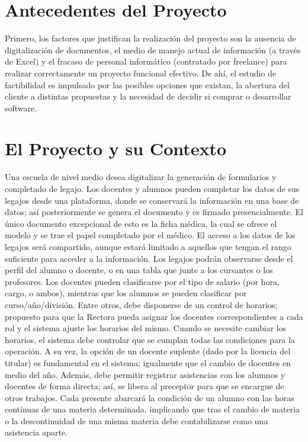 \section[Antecedentes]{Antecedentes del Proyecto}
\normalsize{ \indent
Primero, los factores que justifican la realización del
proyecto son la ausencia de digitalización de documentos,
el medio de manejo actual de información (a través de Excel)
y el fracaso de personal informático (contratado por freelance)
para realizar correctamente un proyecto funcional efectivo.
De ahí, el estudio de factibilidad es impulsado por las posibles
opciones que existan, la abertura del cliente a distintas
propuestas y la necesidad de decidir si comprar o desarrollar
software.
}
\section[Contexto]{El Proyecto y su Contexto}
\normalsize{ \indent
Una escuela de nivel medio desea digitalizar la generación
de formularios y completado de legajo. Los docentes y alumnos
pueden completar los datos de sus legajos desde una plataforma,
donde se conservará la información en una base de datos; así
posteriormente se genera el documento y es firmado
presencialmente. El único documento excepcional de esto es la
ficha médica, la cual se ofrece el modelo y se trae el papel
completado por el médico.
}
\newline
\normalsize{ \indent
El acceso a los datos de los legajos será compartido,
aunque estará limitado a aquellos que tengan el rango
suficiente para acceder a la información. Los legajos
podrán observarse desde el perfil del alumno o docente,
o en una tabla que junte a los cursantes o los profesores.
Los docentes pueden clasificarse por el tipo de salario
(por hora, cargo, o ambos), mientras que los alumnos se
pueden clasificar por curso/año/división.
}
\newline
\normalsize{ \indent
Entre otros, debe disponerse de un control de horarios;
propuesto para que la Rectora pueda asignar los docentes
correspondientes a cada rol y el sistema ajuste los
horarios del mismo. Cuando se necesite cambiar los
horarios, el sistema debe controlar que se cumplan todas
las condiciones para la operación. A su vez, la opción de
un docente suplente (dado por la licencia del titular) es
fundamental en el sistema; igualmente que el cambio de
docentes en medio del año.
}
\newline
\normalsize{ \indent
Además, debe permitir registrar asistencias con los
alumnos y docentes de forma directa; así, se libera
al preceptor para que se encargue de otros trabajos.
Cada presente abarcará la condición de un alumno
con las horas contínuas de una materia determinada,
implicando que tras el cambio de materia o la descontinuidad
de una misma materia debe contabilizarse como una asistencia
aparte.
}
